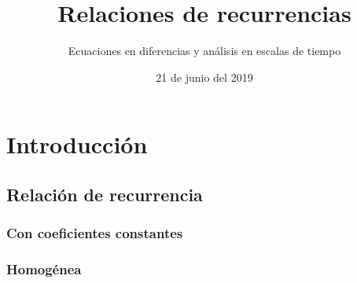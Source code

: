 \documentclass[spanish, utf8,handout]{beamer} %
\title[Teorema de los cuatro colores]{\Huge\sffamily Relaciones de recurrencias}
\subtitle{Ecuaciones en diferencias y análisis en escalas de tiempo}
\author[Grupo N$^\circ6$]{%
	\texorpdfstring{%
		\begin{columns}
			\column{.3\linewidth}
			\centering
			C. Aznarán Laos %
			\column{.3\linewidth}
			\centering
			F. Cruz Ordoñez %
		\end{columns}
		\vspace{12pt}
		\begin{columns}
			\column{.3\linewidth}
			\centering
			G. Quiroz Gómez %
			\column{.3\linewidth}
			\centering
			J. Micha Velasque %
		\end{columns}
		\vspace{12pt}
		\begin{columns}
			\column{.3\linewidth}
			\centering
			D. García Fernández %
			\centering
		\end{columns}
	}
	{Author 1, Author 2, Author 3}
}
\institute[FC -- UNI]{\large%
	Facultad de Ciencias \and%
	Universidad Nacional de Ingeniería
}
\date{21 de junio del 2019}
\theoremstyle{definition}
\begin{document}
\frame{\titlepage}

\begin{frame}{\contentsname}\transblindsvertical
	\tableofcontents
\end{frame}

\section{Introducción}

\subsection{Relación de recurrencia}
\subsubsection{Con coeficientes constantes}
\subsubsection{Homogénea}
\end{document}
